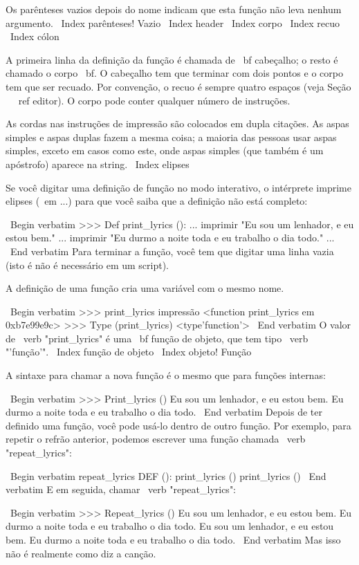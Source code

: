 \documentclass[10pt]{book}
\begin{document}
\begin {itemize}
{Os parênteses vazios depois do nome indicam que esta função
não leva nenhum argumento.
\ Index {parênteses! Vazio}
\ Index {header}
\ Index {corpo}
\ Index {recuo}
\ Index {} cólon

A primeira linha da definição da função é chamada de {\ bf cabeçalho};
o resto é chamado o corpo {\ bf}. O cabeçalho tem que terminar com dois pontos
e o corpo tem que ser recuado. Por convenção, o recuo é
sempre quatro espaços (veja Seção ~ \ ref {editor}). O corpo pode conter
qualquer número de instruções.

As cordas nas instruções de impressão são colocados em dupla
citações. As aspas simples e aspas duplas fazem a mesma coisa;
a maioria das pessoas usar aspas simples, exceto em casos como este, onde
aspas simples (que também é um apóstrofo) aparece na string.
\ Index {} elipses

Se você digitar uma definição de função no modo interativo, o intérprete
imprime elipses ({\ em ...}) para que você saiba que a definição
não está completo:

\ Begin {verbatim}
>>> Def print_lyrics ():
... imprimir "Eu sou um lenhador, e eu estou bem."
... imprimir "Eu durmo a noite toda e eu trabalho o dia todo."
...
\ End {verbatim}
%
Para terminar a função, você tem que digitar uma linha vazia (isto é
não é necessário em um script).

A definição de uma função cria uma variável com o mesmo nome.

\ Begin {verbatim}
>>> print_lyrics impressão
<function print_lyrics em 0xb7e99e9c>
>>> Type (print_lyrics)
<type'function'>
\ End {verbatim}
%
O valor de \ verb "print_lyrics" é uma {\ bf função de objeto}, que
tem tipo \ verb "'função'".
\ Index {função de objeto}
\ Index {objeto! Função}

A sintaxe para chamar a nova função é o mesmo que
para funções internas:

\ Begin {verbatim}
>>> Print_lyrics ()
Eu sou um lenhador, e eu estou bem.
Eu durmo a noite toda e eu trabalho o dia todo.
\ End {verbatim}
%
Depois de ter definido uma função, você pode usá-lo dentro de outro
função. Por exemplo, para repetir o refrão anterior, podemos escrever
uma função chamada \ verb "repeat_lyrics":

\ Begin {verbatim}
repeat_lyrics DEF ():
    print_lyrics ()
    print_lyrics ()
\ End {verbatim}
%
E em seguida, chamar \ verb "repeat_lyrics":

\ Begin {verbatim}
>>> Repeat_lyrics ()
Eu sou um lenhador, e eu estou bem.
Eu durmo a noite toda e eu trabalho o dia todo.
Eu sou um lenhador, e eu estou bem.
Eu durmo a noite toda e eu trabalho o dia todo.
\ End {verbatim}
%
Mas isso não é realmente como diz a canção.


}
\end{itemize}
\end{document}
